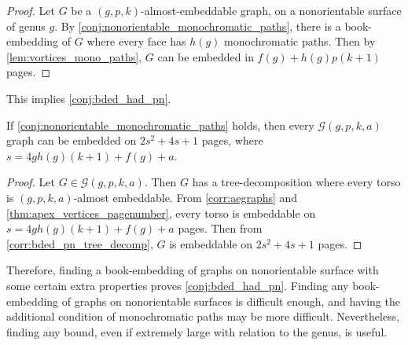 \begin{proof}
	Let $G$ be a $(g, p, k)$-almost-embeddable graph, on a nonorientable surface of genus $g$. By \cref{conj:nonorientable_monochromatic_paths}, there is a book-embedding of $G$ where every face has $h(g)$ monochromatic paths. Then by \cref{lem:vortices_mono_paths}, $G$ can be embedded in $f(g) + h(g) p (k+1)$ pages. 
\end{proof}

This implies \cref{conj:bded_had_pn}.
\begin{corollary}
	If \cref{conj:nonorientable_monochromatic_paths} holds, then every $\mathcal{G}(g, p, k, a)$ graph can be embedded on $2s^2 + 4s + 1$ pages, where $s =  4g h(g) (k + 1) + f(g) + a$. 
\end{corollary}

\begin{proof}
	Let $G \in \mathcal{G}(g, p, k, a)$. Then $G$ has a tree-decomposition where every torso is $(g, p, k, a)$-almost embeddable. From \cref{corr:aegraphs} and \cref{thm:apex_vertices_pagenumber}, every torso is embeddable on $s = 4g h(g) (k + 1) + f(g) + a$ pages. Then from \cref{corr:bded_pn_tree_decomp}, $G$ is embeddable on $2s^2 + 4s + 1$ pages.
\end{proof}

Therefore, finding a book-embedding of graphs on nonorientable surface with some certain extra properties proves \cref{conj:bded_had_pn}. Finding any book-embedding of graphs on nonorientable surfaces is difficult enough, and having the additional condition of monochromatic paths may be more difficult. Nevertheless, finding any bound, even if extremely large with relation to the genus, is useful. 